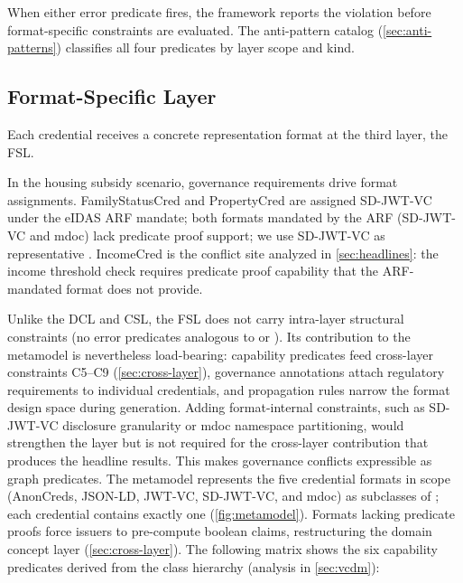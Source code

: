 When either error predicate fires, the framework reports the violation before format-specific constraints are evaluated. The anti-pattern catalog (\autoref{sec:anti-patterns}) classifies all four predicates by layer scope and kind.

\subsection{Format-Specific Layer}\label{sec:fsl}

Each credential receives a concrete representation format at the third layer, the \acf{FSL}.

In the housing subsidy scenario, governance requirements drive format assignments. FamilyStatusCred and PropertyCred are assigned SD-JWT-VC under the eIDAS \ac{ARF} mandate; both formats mandated by the \ac{ARF} (SD-JWT-VC and mdoc) lack predicate proof support; we use SD-JWT-VC as representative \citep{noauthor_eu-digital-identity-walleteudi-doc-architecture-and-reference-framework_2026}. IncomeCred is the conflict site analyzed in \autoref{sec:headlines}: the income threshold check requires predicate proof capability that the ARF-mandated format does not provide.

Unlike the \ac{DCL} and \ac{CSL}, the \ac{FSL} does not carry intra-layer structural constraints (no error predicates analogous to  or ). Its contribution to the metamodel is nevertheless load-bearing: capability predicates feed cross-layer constraints C5--C9 (\autoref{sec:cross-layer}), governance annotations attach regulatory requirements to individual credentials, and propagation rules narrow the format design space during generation. Adding format-internal constraints, such as SD-JWT-VC disclosure granularity or mdoc namespace partitioning, would strengthen the layer but is not required for the cross-layer contribution that produces the headline results. This makes governance conflicts expressible as graph predicates. The metamodel represents the five credential formats in scope (AnonCreds, JSON-LD, JWT-VC, SD-JWT-VC, and mdoc) as subclasses of ; each credential contains exactly one (\autoref{fig:metamodel}). Formats lacking predicate proofs force issuers to pre-compute boolean claims, restructuring the domain concept layer (\autoref{sec:cross-layer}). The following matrix shows the six capability predicates derived from the class hierarchy (analysis in \autoref{sec:vcdm}):

